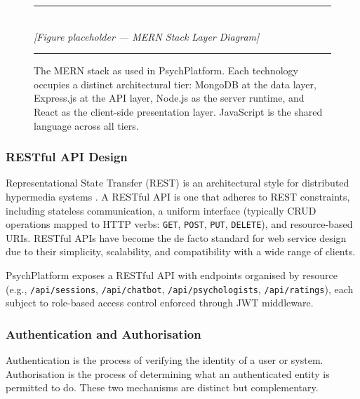 \begin{figure}[H]
  \centering
  \rule{0.85\textwidth}{0.4pt}\\[6pt]
  {\small\itshape [Figure placeholder — MERN Stack Layer Diagram]}
  \rule{0.85\textwidth}{0.4pt}
  \caption{The MERN stack as used in PsychPlatform. Each technology occupies a
           distinct architectural tier: MongoDB at the data layer, Express.js at
           the API layer, Node.js as the server runtime, and React as the
           client-side presentation layer. JavaScript is the shared language
           across all tiers.}
  \label{fig:mern-stack}
\end{figure}

\subsubsection{RESTful API Design}

Representational State Transfer (REST) is an architectural style for distributed
hypermedia systems \cite{Fielding2000}. A RESTful API is one that adheres to REST
constraints, including stateless communication, a uniform interface (typically
CRUD operations mapped to HTTP verbs: \texttt{GET}, \texttt{POST}, \texttt{PUT},
\texttt{DELETE}), and resource-based URIs. RESTful APIs have become the de facto
standard for web service design due to their simplicity, scalability, and
compatibility with a wide range of clients.

PsychPlatform exposes a RESTful API with endpoints organised by resource
(e.g., \texttt{/api/sessions}, \texttt{/api/chatbot},
\texttt{/api/psychologists}, \texttt{/api/ratings}), each subject to role-based
access control enforced through JWT middleware.

\subsubsection{Authentication and Authorisation}

Authentication is the process of verifying the identity of a user or system.
Authorisation is the process of determining what an authenticated entity is
permitted to do. These two mechanisms are distinct but complementary.

